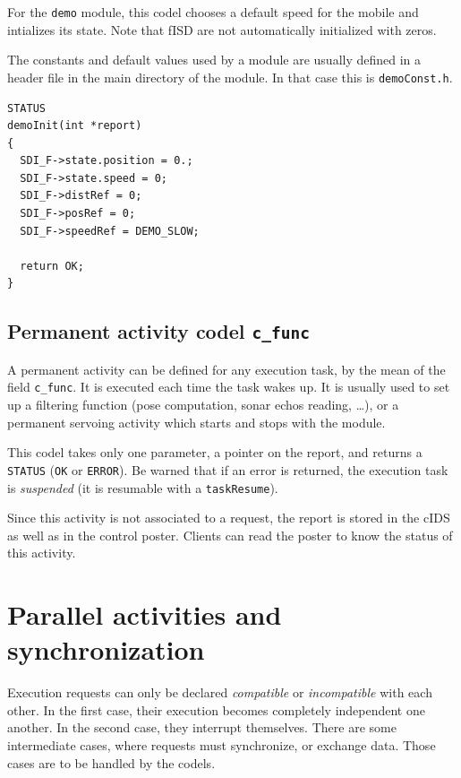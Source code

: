 For the {\tt demo} module,  this codel chooses  a  default speed for  the
mobile  and intializes its state.   Note  that fISD are not automatically
initialized with zeros.

The constants and default values used by a  module are usually defined in
a header file in the main directory  of the module. In  that case this is
{\tt demoConst.h}.

\begin{center}\begin{cartouche}\small\begin{verbatim}
STATUS
demoInit(int *report)
{
  SDI_F->state.position = 0.;
  SDI_F->state.speed = 0;
  SDI_F->distRef = 0;
  SDI_F->posRef = 0;
  SDI_F->speedRef = DEMO_SLOW;

  return OK;
}
\end{verbatim}\end{cartouche}\end{center}


\subsection{Permanent activity codel {\tt c\_func}}

A permanent activity can  be defined for  any execution task, by the mean
of the  field  {\tt c\_func}.  It is executed  each  time the task  wakes
up. It is usually used to set up a  filtering function (pose computation,
sonar echos  reading, \ldots), or   a permanent  servoing activity  which
starts and stops with the module.

This codel takes only one parameter, a pointer on the report, and returns
a {\tt STATUS} ({\tt OK} or {\tt ERROR}).  Be warned that  if an error is
returned, the execution task  is {\em suspended} (it  is resumable with a
{\tt taskResume}).

Since this activity is not associated to a  request, the report is stored
in the cIDS as well as in the control poster. Clients can read the poster
to know the status of this activity.


\section{Parallel activities and synchronization}

Execution   requests can  only  be  declared  {\em   compatible} or  {\em
incompatible} with each other. In the first case, their execution becomes
completely  independent one another.  In  the second case, they interrupt
themselves.  There are  some   intermediate  cases, where  requests  must
synchronize, or exchange  data.   Those cases are  to  be handled  by the
codels.

